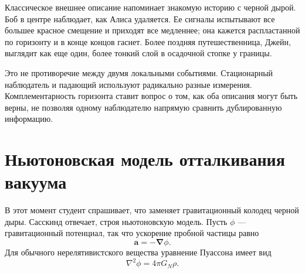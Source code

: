 Классическое внешнее описание напоминает знакомую историю с черной дырой. Боб в центре наблюдает, как Алиса удаляется. Ее сигналы испытывают все большее красное смещение и приходят все медленнее; она кажется распластанной по горизонту и в конце концов гаснет. Более поздняя путешественница, Джейн, выглядит как еще один, более тонкий слой в осадочной стопке у границы.

\begin{classroomqa}
\end{classroomqa}

\begin{classroomqa}
\end{classroomqa}

Это не противоречие между двумя локальными событиями. Стационарный наблюдатель и падающий используют радикально разные измерения. Комплементарность горизонта ставит вопрос о том, как оба описания могут быть верны, не позволяя одному наблюдателю напрямую сравнить дублированную информацию.

\section{Ньютоновская модель отталкивания вакуума}

В этот момент студент спрашивает, что заменяет гравитационный колодец черной дыры. Сасскинд отвечает, строя ньютоновскую модель. Пусть \(\phi\) — гравитационный потенциал, так что ускорение пробной частицы равно
\begin{equation}
\mathbf{a}=-\boldsymbol{\nabla}\phi.
\end{equation}
Для обычного нерелятивистского вещества уравнение Пуассона имеет вид
\begin{equation}
\nabla^2\phi=4\pi G_N\rho.
\label{eq:l09-poisson}
\end{equation}

